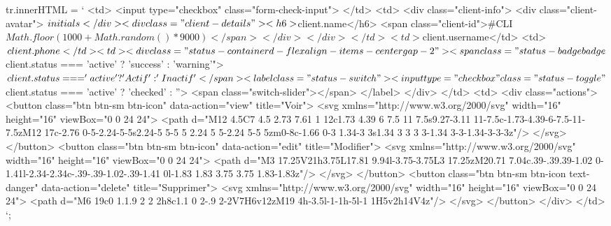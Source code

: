 {{        tr.innerHTML = `
            <td>
                <input type="checkbox" class="form-check-input">
            </td>
            <td>
                <div class="client-info">
                    <div class="client-avatar">
                        ${initials}
                    </div>
                    <div class="client-details">
                        <h6>${client.name}</h6>
                        <span class="client-id">#CLI${Math.floor(1000 + Math.random() * 9000)}</span>
                    </div>
                </div>
            </td>
            <td>${client.username}</td>
            <td>${client.phone}</td>
            <td>
                <div class="status-container d-flex align-items-center gap-2">
                    <span class="status-badge badge ${client.status === 'active' ? 'success' : 'warning'}">
                        ${client.status === 'active' ? 'Actif' : 'Inactif'}
                    </span>
                    <label class="status-switch">
                        <input type="checkbox" class="status-toggle" ${client.status === 'active' ? 'checked' : ''}>
                        <span class="switch-slider"></span>
                    </label>
                </div>
            </td>
            <td>
                <div class="actions">
                    <button class="btn btn-sm btn-icon" data-action="view" title="Voir">
                        <svg xmlns="http://www.w3.org/2000/svg" width="16" height="16" viewBox="0 0 24 24">
                            <path d="M12 4.5C7 4.5 2.73 7.61 1 12c1.73 4.39 6 7.5 11 7.5s9.27-3.11 11-7.5c-1.73-4.39-6-7.5-11-7.5zM12 17c-2.76 0-5-2.24-5-5s2.24-5 5-5 5 2.24 5 5-2.24 5-5 5zm0-8c-1.66 0-3 1.34-3 3s1.34 3 3 3 3-1.34 3-3-1.34-3-3-3z"/>
                        </svg>
                    </button>
                    <button class="btn btn-sm btn-icon" data-action="edit" title="Modifier">
                        <svg xmlns="http://www.w3.org/2000/svg" width="16" height="16" viewBox="0 0 24 24">
                            <path d="M3 17.25V21h3.75L17.81 9.94l-3.75-3.75L3 17.25zM20.71 7.04c.39-.39.39-1.02 0-1.41l-2.34-2.34c-.39-.39-1.02-.39-1.41 0l-1.83 1.83 3.75 3.75 1.83-1.83z"/>
                        </svg>
                    </button>
                    <button class="btn btn-sm btn-icon text-danger" data-action="delete" title="Supprimer">
                        <svg xmlns="http://www.w3.org/2000/svg" width="16" height="16" viewBox="0 0 24 24">
                            <path d="M6 19c0 1.1.9 2 2 2h8c1.1 0 2-.9 2-2V7H6v12zM19 4h-3.5l-1-1h-5l-1 1H5v2h14V4z"/>
                        </svg>
                    </button>
                </div>
            </td>
        `;
        
}}
